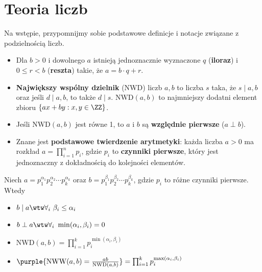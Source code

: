 \section{Teoria liczb}

Na wstępie, przypomnijmy sobie podstawowe definicje i notacje związane z podzielnością liczb.
\begin{itemize}
    \item Dla $b>0$ i dowolnego $a$ istnieją jednoznacznie wyznaczone $q$ (\textbf{iloraz}) i $0\leq r<b$ (\textbf{reszta}) takie, że $a=b\cdot q + r$.

    \item \textbf{Największy wspólny dzielnik} (NWD) liczb $a,b$ to liczba $s$ taka, że $s\mid a,b$ oraz jeśli $d\mid a,b$, to także $d\mid s$. $\mathrm{NWD}(a,b)$ to najmniejszy dodatni element zbioru $\{ax+by : x,y\in\ZZ\}$.
    
    \item Jeśli $\mathrm{NWD}(a,b)$ jest równe 1, to $a$ i $b$ są \textbf{względnie pierwsze} ($a\perp b$).

    \item Znane jest \textbf{podstawowe twierdzenie arytmetyki}: każda liczba $a>0$ ma rozkład $a=\prod_{i=1}^{n}p_i$, gdzie $p_i$ to \textbf{czynniki pierwsze}, który jest jednoznaczny z dokładnością do kolejności elementów.
\end{itemize}







\begin{example}
    Niech $a=p_1^{\alpha_1}p_2^{\alpha_2}\cdots p_k^{\alpha_k}$ oraz $b=p_1^{\beta_1}p_2^{\beta_2}\cdots p_k^{\beta_k}$, gdzie $p_i$ to różne czynniki pierwsze. Wtedy
    \begin{itemize}
        \item $b\mid a \wtw \forall_i \ \beta_i\leq\alpha_i$
        \item $b\perp a \wtw \forall_i \ \min(\alpha_i,\beta_i)=0$
        \item $\mathrm{NWD}(a,b)=\prod_{i=1}^k p_i^{\min(\alpha_i,\beta_i)}$
        \item $\purple{\mathrm{NWW}(a,b)=\frac{ab}{\mathrm{NWD}(a,b)}}=\prod_{i=1}^k p_i^{\max(\alpha_i,\beta_i)}$
    \end{itemize}
\end{example}

